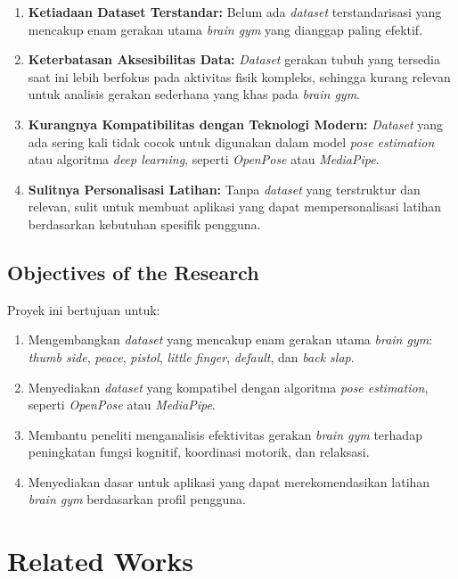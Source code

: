 \documentclass[12pt,a4paper]{article}
\begin{document}
\begin{enumerate}
    \item \textbf{Ketiadaan Dataset Terstandar:} Belum ada \textit{dataset} terstandarisasi yang mencakup enam gerakan utama \textit{brain gym} yang dianggap paling efektif.
    \item \textbf{Keterbatasan Aksesibilitas Data:} \textit{Dataset} gerakan tubuh yang tersedia saat ini lebih berfokus pada aktivitas fisik kompleks, sehingga kurang relevan untuk analisis gerakan sederhana yang khas pada \textit{brain gym}.
    \item \textbf{Kurangnya Kompatibilitas dengan Teknologi Modern:} \textit{Dataset} yang ada sering kali tidak cocok untuk digunakan dalam model \textit{pose estimation} atau algoritma \textit{deep learning}, seperti \textit{OpenPose} atau \textit{MediaPipe}.
    \item \textbf{Sulitnya Personalisasi Latihan:} Tanpa \textit{dataset} yang terstruktur dan relevan, sulit untuk membuat aplikasi yang dapat mempersonalisasi latihan berdasarkan kebutuhan spesifik pengguna.
\end{enumerate}

\subsection{Objectives of the Research}
Proyek ini bertujuan untuk:

\begin{enumerate}
    \item Mengembangkan \textit{dataset} yang mencakup enam gerakan utama \textit{brain gym}: \textit{thumb side}, \textit{peace}, \textit{pistol}, \textit{little finger}, \textit{default}, dan \textit{back slap}.
    \item Menyediakan \textit{dataset} yang kompatibel dengan algoritma \textit{pose estimation}, seperti \textit{OpenPose} atau \textit{MediaPipe}.
    \item Membantu peneliti menganalisis efektivitas gerakan \textit{brain gym} terhadap peningkatan fungsi kognitif, koordinasi motorik, dan relaksasi.
    \item Menyediakan dasar untuk aplikasi yang dapat merekomendasikan latihan \textit{brain gym} berdasarkan profil pengguna.
\end{enumerate}

\newpage
\section{Related Works}
\end{document}
